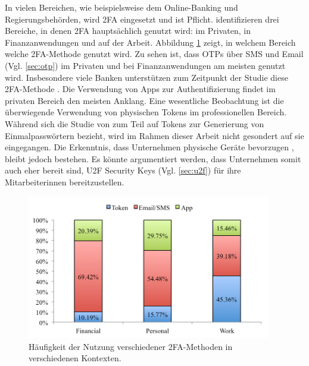 \pskip
In vielen Bereichen, wie beispielsweise dem Online-Banking und Regierungsbehörden, wird \ac{2FA} eingesetzt und ist Pflicht. \textcite{decristofaroComparativeUsability2014} identifizieren drei Bereiche, in denen \ac{2FA} hauptsächlich genutzt wird: im Privaten, in Finanzanwendungen und auf der Arbeit. Abbildung \ref{fig:use} zeigt, in welchem Bereich welche \ac{2FA}-Methode genutzt wird. Zu sehen ist, dass \acp{OTP} über SMS und Email (Vgl. \ref{sec:otp}) im Privaten und bei Finanzanwendungen am meisten genutzt wird. Insbesondere viele Banken unterstützen zum Zeitpunkt der Studie diese \ac{2FA}-Methode \parencite{decristofaroComparativeUsability2014}. Die Verwendung von Apps zur Authentifizierung findet im privaten Bereich den meisten Anklang. Eine wesentliche Beobachtung ist die überwiegende Verwendung von physischen Tokens im professionellen Bereich. Während sich die Studie von \textcite{decristofaroComparativeUsability2014} zum Teil auf Tokens zur Generierung von Einmalpasswörtern bezieht, wird im Rahmen dieser Arbeit nicht gesondert auf sie eingegangen. Die Erkenntnis, dass Unternehmen physische Geräte bevorzugen \parencite{decristofaroComparativeUsability2014}, bleibt jedoch bestehen. Es könnte argumentiert werden, dass Unternehmen somit auch eher bereit sind, \acs{U2F} Security Keys (Vgl. \ref{sec:u2f}) für ihre Mitarbeiterinnen bereitzustellen.

\begin{figure}
  \begin{center}
    \includegraphics[width=0.95\textwidth]{assets/use.png}
  \end{center}
  \caption[Häufigkeit der Nutzung verschiedener \acs{2FA}-Methoden]{Häufigkeit der Nutzung verschiedener \acs{2FA}-Methoden in verschiedenen Kontexten.\\\parencite[6]{decristofaroComparativeUsability2014}}
  \label{fig:use}
\end{figure}


